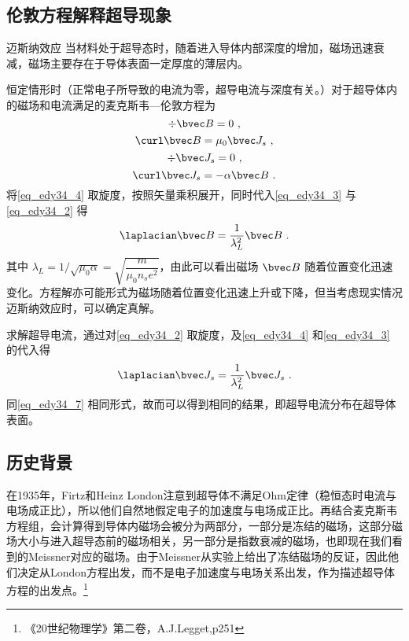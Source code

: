 \subsection{伦敦方程解释超导现象}\label{sub_edy34_1}
\begin{theorem}{迈斯纳效应}
当材料处于超导态时，随着进入导体内部深度的增加，磁场迅速衰减，磁场主要存在于导体表面一定厚度的薄层内。
\end{theorem}
恒定情形时（正常电子所导致的电流为零，超导电流与深度有关。）对于超导体内的磁场和电流满足的麦克斯韦—伦敦方程为
\begin{equation}
\div \bvec B=0\label{eq_edy34_3}~,
\end{equation}
\begin{equation}
\curl \bvec B=\mu_0 \bvec J_s\label{eq_edy34_4}~,
\end{equation}
\begin{equation}
\div \bvec J_s=0\label{eq_edy34_5}~,
\end{equation}
\begin{equation}
\curl \bvec J_s=-\alpha\bvec B~.
\end{equation}
将\autoref{eq_edy34_4} 取旋度，按照矢量乘积展开，同时代入\autoref{eq_edy34_3} 与\autoref{eq_edy34_2} 得
\begin{equation}
\laplacian \bvec B=\dfrac{1}{\lambda_L^2}\bvec B \label{eq_edy34_7}~.
\end{equation}
其中 $\lambda_L= 1/\sqrt{\mu_0\alpha}=\sqrt{\dfrac m {\mu_0n_se^2}}$，由此可以看出磁场 $\bvec B$ 随着位置变化迅速变化。方程解亦可能形式为磁场随着位置变化迅速上升或下降，但当考虑现实情况迈斯纳效应时，可以确定真解。

求解超导电流，通过对\autoref{eq_edy34_2} 取旋度，及\autoref{eq_edy34_4} 和\autoref{eq_edy34_3} 的代入得
\begin{equation}
\laplacian\bvec J_s=\dfrac 1 {\lambda_L^2}\bvec J_s~.
\end{equation}
同\autoref{eq_edy34_7} 相同形式，故而可以得到相同的结果，即超导电流分布在超导体表面。

\subsection{历史背景}
在1935年，Firtz和Heinz London注意到超导体不满足Ohm定律（稳恒态时电流与电场成正比），所以他们自然地假定电子的加速度与电场成正比。再结合麦克斯韦方程组，会计算得到导体内磁场会被分为两部分，一部分是冻结的磁场，这部分磁场大小与进入超导态前的磁场相关，另一部分是指数衰减的磁场，也即现在我们看到的Meissner对应的磁场。由于Meissner从实验上给出了冻结磁场的反证，因此他们决定从London方程出发，而不是电子加速度与电场关系出发，作为描述超导体方程的出发点。\footnote{《20世纪物理学》第二卷，A.J.Legget,p251}

